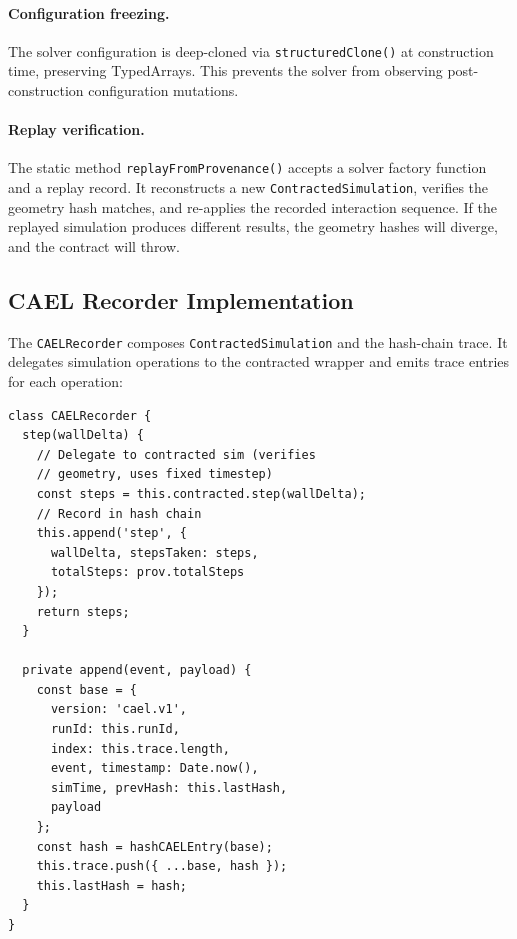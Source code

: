 \documentclass[letterpaper,twocolumn,10pt]{article}
\begin{document}
\paragraph{Configuration freezing.} The solver configuration is
deep-cloned via \texttt{structuredClone()} at construction time,
preserving TypedArrays. This prevents the solver from observing
post-construction configuration mutations.

\paragraph{Replay verification.} The static method
\texttt{replayFromProvenance()} accepts a solver factory function
and a replay record. It reconstructs a new \texttt{ContractedSimulation},
verifies the geometry hash matches, and re-applies the recorded
interaction sequence. If the replayed simulation produces different
results, the geometry hashes will diverge, and the contract will
throw.

\subsection{CAEL Recorder Implementation}

The \texttt{CAELRecorder} composes \texttt{ContractedSimulation}
and the hash-chain trace. It delegates simulation operations to
the contracted wrapper and emits trace entries for each operation:

\begin{lstlisting}[caption={CAELRecorder composition. Each simulation
  operation is both contract-verified and trace-recorded.}]
class CAELRecorder {
  step(wallDelta) {
    // Delegate to contracted sim (verifies
    // geometry, uses fixed timestep)
    const steps = this.contracted.step(wallDelta);
    // Record in hash chain
    this.append('step', {
      wallDelta, stepsTaken: steps,
      totalSteps: prov.totalSteps
    });
    return steps;
  }

  private append(event, payload) {
    const base = {
      version: 'cael.v1',
      runId: this.runId,
      index: this.trace.length,
      event, timestamp: Date.now(),
      simTime, prevHash: this.lastHash,
      payload
    };
    const hash = hashCAELEntry(base);
    this.trace.push({ ...base, hash });
    this.lastHash = hash;
  }
}
\end{lstlisting}

\end{document}
